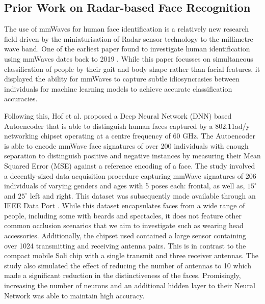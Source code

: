 \documentclass{interim}
\begin{document}
\subsection{Prior Work on Radar-based Face Recognition}
The use of mmWaves for human face identification is a relatively new research field driven by the miniaturisation of Radar sensor technology to the millimetre wave band. One of the earliest paper found to investigate human identification using mmWaves dates back to 2019 \cite{zhao2019mid}. While this paper focusses on simultaneous classification of people by their gait and body shape rather than facial features, it displayed the ability for mmWaves to capture subtle idiosyncrasies between individuals for machine learning models to achieve accurate classification accuracies.  

Following this, Hof et al. \cite{hof2020face} proposed a Deep Neural Network (DNN) based Autoencoder that is able to distinguish human faces captured by a 802.11ad/y networking chipset operating at a centre frequency of 60 GHz. The Autoencoder is able to encode mmWave face signatures of over 200 individuals with enough separation to distinguish positive and negative instances by measuring their Mean Squared Error (MSE) against a reference encoding of a face. The study involved a decently-sized data acquisition procedure capturing mmWave signatures of 206 individuals of varying genders and ages with 5 poses each: frontal, as well as, $15^\circ$ and $25^\circ$ left and right. This dataset was subsequently made available through an IEEE Data Port \cite{mmwavefacedata}. While this dataset encapsulates faces from a wide range of people, including some with beards and spectacles, it does not feature other common occlusion scenarios that we aim to investigate such as wearing head accessories. Additionally, the chipset used contained a large sensor containing over 1024 transmitting and receiving antenna pairs. This is in contrast to the compact mobile Soli chip with a single transmit and three receiver antennas. The study also simulated the effect of reducing the number of antennas to 10 which made a significant reduction in the distinctiveness of the faces. Promisingly, increasing the number of neurons and an additional hidden layer to their Neural Network was able to maintain high accuracy.
\end{document}
